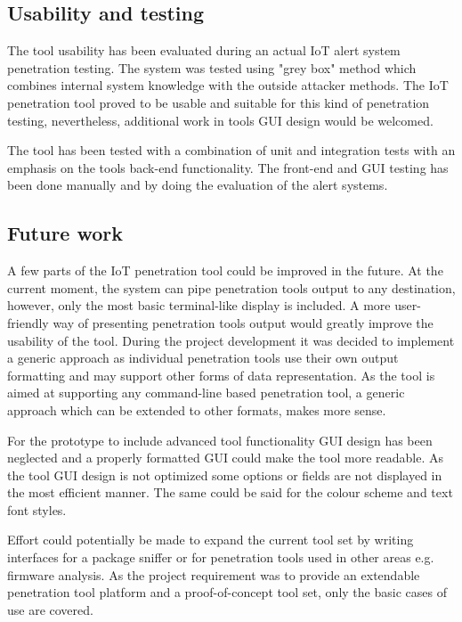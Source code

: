 	\subsection{Usability and testing}
	The tool usability has been evaluated during an actual IoT alert system penetration testing. The system was tested using "grey box" method which combines internal system knowledge with the outside attacker methods. The IoT penetration tool proved to be usable and suitable for this kind of penetration testing, nevertheless, additional work in tools GUI design would be welcomed.
	
	The tool has been tested with a combination of unit and integration tests with an emphasis on the tools back-end functionality. The front-end and GUI testing has been done manually and by doing the evaluation of the alert systems.
	
	\subsection{Future work}\label{future-work}
	A few parts of the IoT penetration tool could be improved in the future. \newline
	At the current moment, the system can pipe penetration tools output to any destination, however, only the most basic terminal-like display is included. A more user-friendly way of presenting penetration tools output would greatly improve the usability of the tool. During the project development it was decided to implement a generic approach as individual penetration tools use their own output formatting and may support other forms of data representation. As the tool is aimed at supporting any command-line based penetration tool, a generic approach which can be extended to other formats, makes more sense. 
	
	For the prototype to include advanced tool functionality GUI design has been neglected and a properly formatted GUI could make the tool more readable. As the tool GUI design is not optimized some options or fields are not displayed in the most efficient manner. The same could be said for the colour scheme and text font styles.
	
	Effort could potentially be made to expand the current tool set by writing interfaces for a package sniffer or for penetration tools used in other areas e.g. firmware analysis. As the project requirement was to provide an extendable penetration tool platform and a proof-of-concept tool set, only the basic cases of use are covered. 
	
